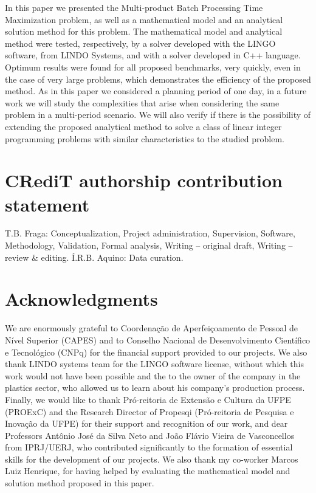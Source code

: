 \documentclass[authoryear,preprint,12pt]{elsarticle}
\begin{document}
In this paper we presented the Multi-product Batch Processing Time Maximization problem, as well as a mathematical model and an analytical solution method for this problem. The mathematical model and analytical method were tested, respectively, by a solver developed with the LINGO software, from LINDO Systems, and with a solver developed in C++ language. Optimum results were found for all proposed benchmarks, very quickly, even in the case of very large problems, which demonstrates the efficiency of the proposed method. As in this paper we considered a planning period of one day, in a future work we will study the complexities that arise when considering the same problem in a multi-period scenario. We will also verify if there is the possibility of extending the proposed analytical method to solve a class of linear integer programming problems with similar characteristics to the studied problem.

\section{CRediT authorship contribution statement} 
\label{sec:contributions}

T.B. Fraga: Conceptualization, Project administration, Supervision, Software, Methodology, Validation, Formal analysis, Writing – original draft, Writing – review \& editing. Í.R.B. Aquino: Data curation.

\section{Acknowledgments}
\label{sec:acknowledgments}

We are enormously grateful to Coordenação de Aperfeiçoamento de Pessoal de Nível Superior (CAPES) and to Conselho Nacional de Desenvolvimento Científico e Tecnológico (CNPq) for the financial support provided to our projects. We also thank LINDO systems team for the LINGO software license, without which this work would not have been possible and the to the owner of the company in the plastics sector, who allowed us to learn about his company's production process. Finally, we would like to thank Pró-reitoria de Extensão e Cultura da UFPE (PROExC) and the Research Director of Propesqi (Pró-reitoria de Pesquisa e Inovação da UFPE) for their support and recognition of our work, and dear Professors Antônio José da Silva Neto and João Flávio Vieira de Vasconcellos from IPRJ/UERJ, who contributed significantly to the formation of essential skills for the development of our projects. We also thank my co-worker Marcos Luiz Henrique, for having helped by evaluating the mathematical model and solution method proposed in this paper.
\end{document}
